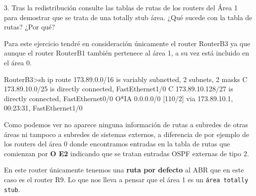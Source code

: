 \begin{ejer}
3. Tras la redistribución consulte las tablas de rutas de los routers del Área 1 para demostrar que se trata de una totally stub área. ¿Qué sucede con la tabla de rutas? ¿Por qué?
\end{ejer}
\par Para este ejercicio tendré en consideración únicamente el router RouterB3 ya que aunque el router RouterB1 también pertenece al área 1, a su vez está incluido en el área 0.
\begin{listing}[style=consola]
RouterB3>sh ip route
     173.89.0.0/16 is variably subnetted, 2 subnets, 2 masks
C       173.89.10.0/25 is directly connected, FastEthernet1/0
C       173.89.10.128/27 is directly connected, FastEthernet0/0
O*IA 0.0.0.0/0 [110/2] via 173.89.10.1, 00:23:31, FastEthernet1/0
\end{listing}
\par Como podemos ver no aparece ninguna información de rutas a subredes de otras áreas ni tampoco a subredes de sistemas externos, a diferencia de por ejemplo de los routers del área 0 donde encontramos entradas en la tabla de rutas que comienzan por \textbf{O E2} indicando que se tratan entradas OSPF externas de tipo 2.
\par En este router únicamente tenemos una \textbf{ruta por defecto} al ABR que en este caso es el router R9. Lo que nos lleva a pensar que el área 1 es un \texttt{área totally stub}.
